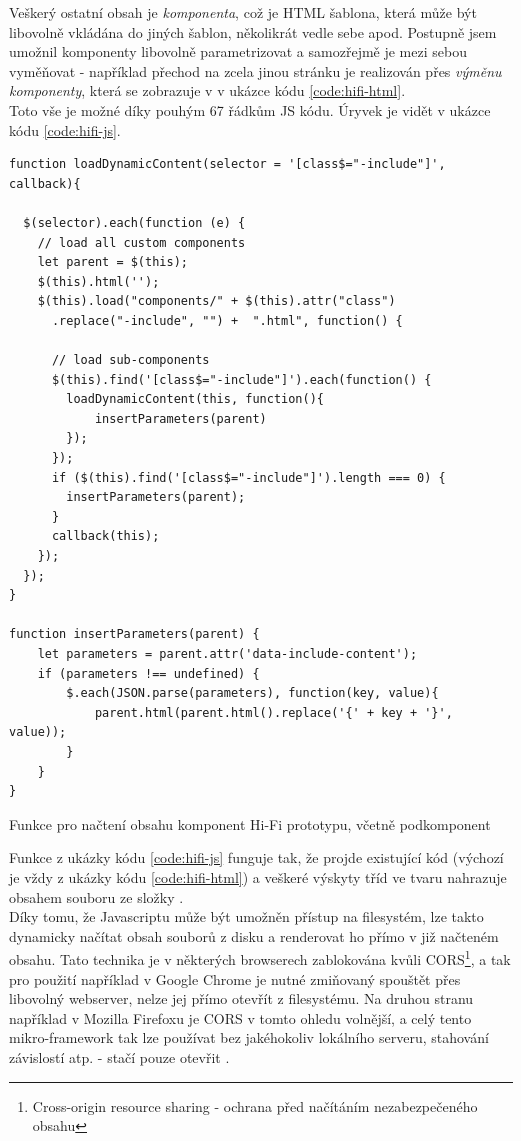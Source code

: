 Veškerý ostatní obsah je \emph{komponenta}, což je HTML šablona, která může být libovolně vkládána do jiných šablon, několikrát vedle sebe apod. Postupně jsem umožnil komponenty libovolně parametrizovat a samozřejmě je mezi sebou vyměňovat - například přechod na zcela jinou stránku je realizován přes \emph{výměnu komponenty}, která se zobrazuje v  v ukázce kódu \ref{code:hifi-html}.\\
Toto vše je možné díky pouhým 67 řádkům JS kódu. Úryvek je vidět v ukázce kódu \ref{code:hifi-js}.

\begin{listing}[H]
\begin{verbatim}
function loadDynamicContent(selector = '[class$="-include"]', callback){

  $(selector).each(function (e) {
    // load all custom components
    let parent = $(this);
    $(this).html('');
    $(this).load("components/" + $(this).attr("class")
      .replace("-include", "") +  ".html", function() {

      // load sub-components
      $(this).find('[class$="-include"]').each(function() {
        loadDynamicContent(this, function(){
            insertParameters(parent)
        });
      });
      if ($(this).find('[class$="-include"]').length === 0) {
        insertParameters(parent);
      }
      callback(this);
    });
  });
}

function insertParameters(parent) {
    let parameters = parent.attr('data-include-content');
    if (parameters !== undefined) {
        $.each(JSON.parse(parameters), function(key, value){
            parent.html(parent.html().replace('{' + key + '}', value));
        }
    }
}
\end{verbatim}
\caption[Funkce pro načtení obsahu komponent Hi-Fi prototypu]{Funkce pro načtení obsahu komponent Hi-Fi prototypu, včetně podkomponent} \label{code:hifi-js}
\end{listing}

Funkce  z ukázky kódu \ref{code:hifi-js} funguje tak, že projde existující kód (výchozí je vždy  z ukázky kódu \ref{code:hifi-html}) a veškeré výskyty tříd ve tvaru  nahrazuje obsahem souboru  ze složky .\\
Díky tomu, že Javascriptu může být umožněn přístup na filesystém, lze takto dynamicky načítat obsah souborů z disku a renderovat ho přímo v již načteném obsahu. Tato technika je v některých browserech zablokována kvůli CORS\footnote{Cross-origin resource sharing - ochrana před načítáním nezabezpečeného obsahu}, a tak pro použití například v Google Chrome je nutné zmiňovaný  spouštět přes libovolný webserver, nelze jej přímo otevřít z filesystému. Na druhou stranu například v Mozilla Firefoxu je CORS v tomto ohledu volnější, a celý tento mikro-framework tak lze používat bez jakéhokoliv lokálního serveru, stahování závislostí atp. - stačí pouze otevřit .\\

